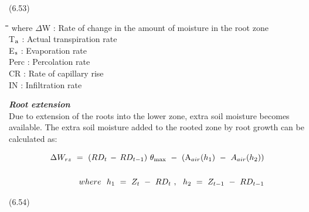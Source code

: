 \documentclass[11pt]{article}
\begin{document}
 \bigskip
\strut\hfill (6.53)
\nwln
\begin{tabbing}
\hspace{1.27cm}\=\hspace{1.27cm}\=\hspace{1.27cm}\=\hspace{1.27cm}\=%
\hspace{1.27cm}\=\hspace{1.27cm}\=\hspace{1.27cm}\=\hspace{1.27cm}\=%
\hspace{1.27cm}\=\hspace{1.27cm}\=\kill
where\> $\Delta$W\> : Rate of change in the amount of moisture in the root zone\> \> \> \> \> \> \> \> [cm d$^{{\rm -1}}$]\\
\>T$_{{\rm a}}$\> : Actual transpiration rate\> \> \> \> \> \> \> \> [cm d$^{{\rm -1}}$]\\
\>E$_{{\rm s}}$\> : Evaporation rate\> \> \> \> \> \> \> \> [cm d$^{{\rm -1}}$]\\
\>Perc\> : Percolation rate\> \> \> \> \> \> \> \> [cm d$^{{\rm -1}}$]\\
\>CR\> : Rate of capillary rise\> \> \> \> \> \> \> \> [cm d$^{{\rm -1}}$]\\
\>IN\> : Infiltration rate\> \> \> \> \> \> \> \> [cm d$^{{\rm -1}}$]
\end{tabbing}

\bigskip
\bigskip
{\it {\bf Root extension}\/}\\
Due to extension of the roots into the lower zone, extra soil moisture becomes available.
The extra soil moisture added to the rooted zone by root growth can be calculated as:

\begin{eqnarray*}
\, \Delta W _{rz} ~=~(RD _{t} \, -\, RD _{t-1} )~\theta _{\max } ~-~({\rm A} _{air} (h _{1} )~-~A _{air} (h _{2} ))  \nonumber  \\
\, \nonumber  \\
where~~h _{1} ~=~Z _{t~} -~RD _{t~} ,~~h _{2} ~=~Z _{t-1} ~-~RD _{t-1}
\end{eqnarray*}

 \bigskip
\strut\hfill (6.54)
\end{document}
